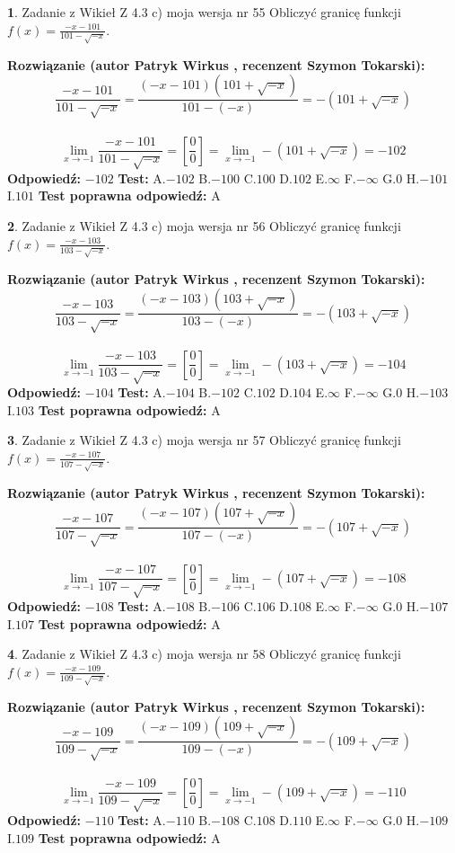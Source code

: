 \documentclass[12pt, a4paper]{article}
\theoremstyle{definition} %
\newtheorem{zad}{}
\newcommand{\zadStart}[1]{\begin{zad}#1\newline}
\newcommand{\zadStop}{\end{zad}}
\newcommand{\rozwStart}[2]{\noindent \textbf{Rozwiązanie (autor #1 , recenzent #2): }\newline}
\newcommand{\rozwStop}{\newline}
\newcommand{\odpStart}{\noindent \textbf{Odpowiedź:}\newline}
\newcommand{\odpStop}{\newline}
\newcommand{\testStart}{\noindent \textbf{Test:}\newline}
\newcommand{\testStop}{\newline}
\newcommand{\kluczStart}{\noindent \textbf{Test poprawna odpowiedź:}\newline}
\newcommand{\kluczStop}{\newline}
\begin{document}
\zadStart{Zadanie z Wikieł Z 4.3 c) moja wersja nr 55}
Obliczyć granicę funkcji $f(x)=\frac{-x-101}{101-\sqrt{-x}}$.
\zadStop
\rozwStart{Patryk Wirkus}{Szymon Tokarski}
$$\frac{-x-101}{101-\sqrt{-x}}=\frac{(-x-101)(101+\sqrt{-x})}{101-(-x)}=-(101+\sqrt{-x})$$
\\
$$\lim\limits_{x\to-1}\frac{-x-101}{101-\sqrt{-x}}=[\frac{0}{0}]=\lim\limits_{x\to-1}-(101+\sqrt{-x}) =-102$$
\rozwStop
\odpStart
$-102$
\odpStop
\testStart
A.$-102$
B.$-100$
C.$100$
D.$102$
E.$\infty$
F.$-\infty$
G.$0$
H.$-101$
I.$101$
\testStop
\kluczStart
A
\kluczStop



\zadStart{Zadanie z Wikieł Z 4.3 c) moja wersja nr 56}
Obliczyć granicę funkcji $f(x)=\frac{-x-103}{103-\sqrt{-x}}$.
\zadStop
\rozwStart{Patryk Wirkus}{Szymon Tokarski}
$$\frac{-x-103}{103-\sqrt{-x}}=\frac{(-x-103)(103+\sqrt{-x})}{103-(-x)}=-(103+\sqrt{-x})$$
\\
$$\lim\limits_{x\to-1}\frac{-x-103}{103-\sqrt{-x}}=[\frac{0}{0}]=\lim\limits_{x\to-1}-(103+\sqrt{-x}) =-104$$
\rozwStop
\odpStart
$-104$
\odpStop
\testStart
A.$-104$
B.$-102$
C.$102$
D.$104$
E.$\infty$
F.$-\infty$
G.$0$
H.$-103$
I.$103$
\testStop
\kluczStart
A
\kluczStop



\zadStart{Zadanie z Wikieł Z 4.3 c) moja wersja nr 57}
Obliczyć granicę funkcji $f(x)=\frac{-x-107}{107-\sqrt{-x}}$.
\zadStop
\rozwStart{Patryk Wirkus}{Szymon Tokarski}
$$\frac{-x-107}{107-\sqrt{-x}}=\frac{(-x-107)(107+\sqrt{-x})}{107-(-x)}=-(107+\sqrt{-x})$$
\\
$$\lim\limits_{x\to-1}\frac{-x-107}{107-\sqrt{-x}}=[\frac{0}{0}]=\lim\limits_{x\to-1}-(107+\sqrt{-x}) =-108$$
\rozwStop
\odpStart
$-108$
\odpStop
\testStart
A.$-108$
B.$-106$
C.$106$
D.$108$
E.$\infty$
F.$-\infty$
G.$0$
H.$-107$
I.$107$
\testStop
\kluczStart
A
\kluczStop



\zadStart{Zadanie z Wikieł Z 4.3 c) moja wersja nr 58}
Obliczyć granicę funkcji $f(x)=\frac{-x-109}{109-\sqrt{-x}}$.
\zadStop
\rozwStart{Patryk Wirkus}{Szymon Tokarski}
$$\frac{-x-109}{109-\sqrt{-x}}=\frac{(-x-109)(109+\sqrt{-x})}{109-(-x)}=-(109+\sqrt{-x})$$
\\
$$\lim\limits_{x\to-1}\frac{-x-109}{109-\sqrt{-x}}=[\frac{0}{0}]=\lim\limits_{x\to-1}-(109+\sqrt{-x}) =-110$$
\rozwStop
\odpStart
$-110$
\odpStop
\testStart
A.$-110$
B.$-108$
C.$108$
D.$110$
E.$\infty$
F.$-\infty$
G.$0$
H.$-109$
I.$109$
\testStop
\kluczStart
A
\kluczStop
\end{document}
